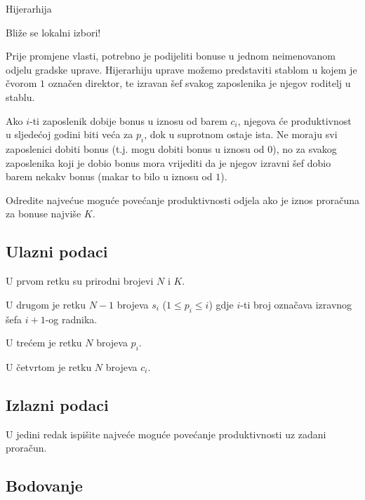 \begin{statement}[
  problempoints=100,
  timelimit=1 sekunda,
  memorylimit=1024 MiB,
]{Hijerarhija}\

Bliže se lokalni izbori!

Prije promjene vlasti, potrebno je podijeliti bonuse u jednom neimenovanom odjelu gradske uprave. Hijerarhiju uprave možemo predstaviti stablom u kojem je čvorom $1$ označen direktor, te izravan šef svakog zaposlenika je njegov roditelj u stablu.

Ako $i$-ti zaposlenik dobije bonus u iznosu od barem $c_i$, njegova će produktivnost u sljedećoj godini biti veća za $p_i$, dok u suprotnom ostaje ista. Ne moraju svi zaposlenici dobiti bonus (t.j. mogu dobiti bonus u iznosu od $0$), no za svakog zaposlenika koji je dobio bonus mora vrijediti da je njegov izravni šef dobio barem nekakv bonus (makar to bilo u iznosu od $1$).

Odredite najvećue moguće povećanje produktivnosti odjela ako je iznos proračuna za bonuse najviše $K$.

\subsection*{Ulazni podaci}

U prvom retku su prirodni brojevi $N$ i $K$.

U drugom je retku $N - 1$ brojeva $s_i$ ($1 \leq p_i \leq i$) gdje $i$-ti broj označava izravnog šefa $i+1$-og radnika.

U trećem je retku $N$ brojeva $p_i$.

U četvrtom je retku $N$ brojeva $c_i$. 

\subsection*{Izlazni podaci}

U jedini redak ispišite najveće moguće povećanje produktivnosti uz zadani proračun.

\subsection*{Bodovanje}


\end{statement}
